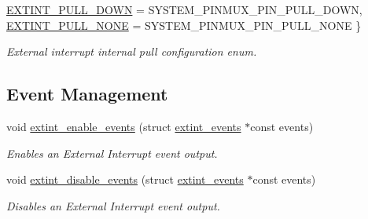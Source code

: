 \begin{DoxyCompactItemize}
\mbox{\hyperlink{group__asfdoc__sam0__extint__group_gga01b49a5a87ca71359c5a9bc2ee02853eadddb16f8c9c7160fe222de4e25733564}{E\+X\+T\+I\+N\+T\+\_\+\+P\+U\+L\+L\+\_\+\+D\+O\+WN}} = S\+Y\+S\+T\+E\+M\+\_\+\+P\+I\+N\+M\+U\+X\+\_\+\+P\+I\+N\+\_\+\+P\+U\+L\+L\+\_\+\+D\+O\+WN, 
\mbox{\hyperlink{group__asfdoc__sam0__extint__group_gga01b49a5a87ca71359c5a9bc2ee02853ea003da62f2c3410edfd555aecdbdccbd8}{E\+X\+T\+I\+N\+T\+\_\+\+P\+U\+L\+L\+\_\+\+N\+O\+NE}} = S\+Y\+S\+T\+E\+M\+\_\+\+P\+I\+N\+M\+U\+X\+\_\+\+P\+I\+N\+\_\+\+P\+U\+L\+L\+\_\+\+N\+O\+NE
 \}
\begin{DoxyCompactList}\small\item\em External interrupt internal pull configuration enum. \end{DoxyCompactList}\end{DoxyCompactItemize}
\subsection*{Event Management}
\begin{DoxyCompactItemize}
\item 
void \mbox{\hyperlink{group__asfdoc__sam0__extint__group_gadbcf557b05082e2d25111e3ad9e3385e}{extint\+\_\+enable\+\_\+events}} (struct \mbox{\hyperlink{structextint__events}{extint\+\_\+events}} $\ast$const events)
\begin{DoxyCompactList}\small\item\em Enables an External Interrupt event output. \end{DoxyCompactList}\item 
void \mbox{\hyperlink{group__asfdoc__sam0__extint__group_ga1e150eaf8dde1371cb31111f5feae5e4}{extint\+\_\+disable\+\_\+events}} (struct \mbox{\hyperlink{structextint__events}{extint\+\_\+events}} $\ast$const events)
\begin{DoxyCompactList}\small\item\em Disables an External Interrupt event output. \end{DoxyCompactList}\end{DoxyCompactItemize}
